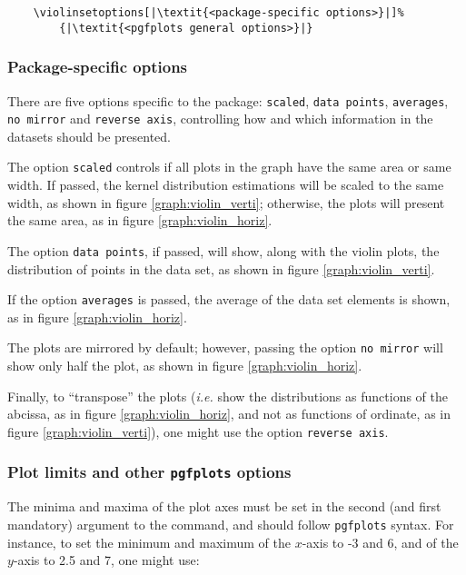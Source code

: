 \documentclass{article}
\begin{document}
\begin{verbatim}
	\violinsetoptions[|\textit{<package-specific options>}|]%
		{|\textit{<pgfplots general options>}|}
\end{verbatim}

\subsubsection{Package-specific options}

There are five options specific to the package: \texttt{scaled},
\texttt{data points}, \texttt{averages}, \texttt{no mirror} and
\texttt{reverse axis}, controlling how and which information
in the datasets should be presented.

The option \texttt{scaled} controls if all plots in the graph
have the same area or same width. If passed, the kernel
distribution estimations will be scaled to the same width, as
shown in figure \ref{graph:violin_verti}; otherwise, the plots
will present the same area, as in figure \ref{graph:violin_horiz}.

The option \texttt{data points}, if passed, will show, along with
the violin plots, the distribution of points in the data set, as shown in
figure \ref{graph:violin_verti}.

If the option \texttt{averages} is passed, the average of the data set
elements is shown, as in figure \ref{graph:violin_horiz}.

The plots are mirrored by default; however, passing the option \texttt{no mirror}
will show only half the plot, as shown in figure \ref{graph:violin_horiz}.

Finally, to ``transpose'' the plots (\textit{i.e.} show the distributions
as functions of the abcissa, as in figure \ref{graph:violin_horiz},
and not as functions of ordinate, as in figure \ref{graph:violin_verti}),
one might use the option \texttt{reverse axis}.

\subsubsection{Plot limits and other \texttt{pgfplots} options}

The minima and maxima of the plot axes must be set in the second (and first
mandatory) argument to the command, and should follow \texttt{pgfplots}
syntax. For instance, to set the minimum and maximum of the $x$-axis
to -3 and 6, and of the $y$-axis to 2.5 and 7, one might use:
\end{document}
